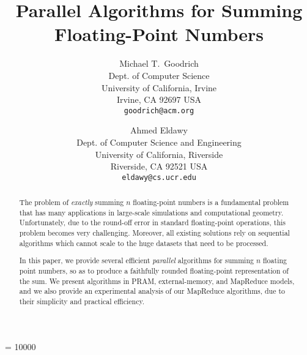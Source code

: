 \documentclass[11pt]{article}
\begin{document}
\ifFull\else
{} 
\fi

\widowpenalty = 10000
\title{Parallel Algorithms for Summing Floating-Point Numbers}

\author{Michael T.~Goodrich \\[5pt]
Dept. of Computer Science \\
University of California, Irvine \\
Irvine, CA 92697 USA \\
\texttt{goodrich@acm.org}
\and
Ahmed Eldawy \\[5pt]
Dept. of Computer Science and Engineering \\
University of California, Riverside \\
Riverside, CA 92521 USA \\
\texttt{eldawy@cs.ucr.edu}
}

\date{}

\maketitle


\begin{abstract}
The problem of {\em exactly} summing $n$ floating-point numbers
is a fundamental problem that has many applications in large-scale
simulations and computational geometry. Unfortunately, due to the
round-off error in standard floating-point operations, this problem
becomes very challenging. Moreover, all existing solutions rely on
sequential algorithms which cannot scale to the huge datasets that
need to be processed.


In this paper, we provide several efficient {\em parallel} algorithms
for summing $n$ floating point numbers, so as to produce
a faithfully rounded floating-point representation of the sum.
We present algorithms in PRAM, external-memory, and MapReduce models,
and we also provide an experimental analysis of our MapReduce algorithms,
due to their simplicity and practical efficiency.
\end{abstract}
\end{document}
